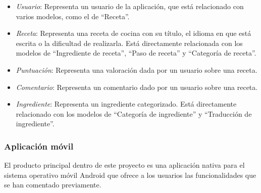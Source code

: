 \documentclass[a4paper,12pt]{article}
\begin{document}
\begin{itemize}
\item \textit{Usuario}: Representa un usuario de la aplicación, que está relacionado
  con varios modelos, como el de ``Receta''.
\item \textit{Receta}: Representa una receta de cocina con su título, el idioma
  en que está escrita o la dificultad de realizarla. Está directamente
  relacionada con los modelos de ``Ingrediente de receta'', ``Paso de receta'' y
  ``Categoría de receta''.
\item \textit{Puntuación}: Representa una valoración dada por un usuario sobre
  una receta.
\item \textit{Comentario}: Representa un comentario dado por un usuario sobre
  una receta.
\item \textit{Ingrediente}: Representa un ingrediente categorizado. Está
  directamente relacionado con los modelos de ``Categoría de ingrediente'' y
  ``Traducción de ingrediente''.
\end{itemize}


\subsubsection{Aplicación móvil}

El producto principal dentro de este proyecto es una aplicación nativa para el
sistema operativo móvil Android que ofrece a los usuarios las funcionalidades que
se han comentado previamente.
\end{document}

